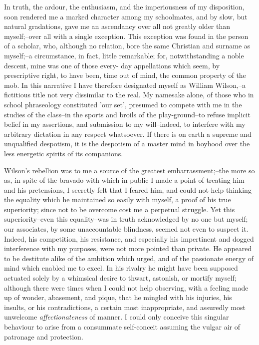 \documentclass[12pt]{article}
\begin{document}
     In truth, the ardour, the enthusiasm, and the imperiousness of
my disposition, soon rendered me a marked character among my
schoolmates, and by slow, but natural gradations, gave me an
ascendancy over all not greatly older than myself;--over all with
a single exception.  This exception was found in the person of a
scholar, who, although no relation, bore the same Christian and
surname as myself;--a circumstance, in fact, little remarkable;
for, notwithstanding a noble descent, mine was one of those every-
day appellations which seem, by prescriptive right, to have been,
time out of mind, the common property of the mob.  In this
narrative I have therefore designated myself as William Wilson,--a
fictitious title not very dissimilar to the real.  My namesake
alone, of those who in school phraseology constituted 'our set',
presumed to compete with me in the studies of the class--in the
sports and broils of the play-ground--to refuse implicit belief in
my assertions, and submission to my will--indeed, to interfere with
my arbitrary dictation in any respect whatsoever.  If there is on
earth a supreme and unqualified despotism, it is the despotism of
a master mind in boyhood over the less energetic spirits of its
companions.

     Wilson's rebellion was to me a source of the greatest
embarrassment;--the more so as, in spite of the bravado with which
in public I made a point of treating him and his pretensions, I
secretly felt that I feared him, and could not help thinking the
equality which he maintained so easily with myself, a proof
of his true superiority; since not to be overcome cost me a
perpetual struggle.  Yet this superiority--even this equality--was
in truth acknowledged by no one but myself; our associates, by some
unaccountable blindness, seemed not even to suspect it.  Indeed,
his competition, his resistance, and especially his impertinent and
dogged interference with my purposes, were not more pointed than
private.  He appeared to be destitute alike of the ambition which
urged, and of the passionate energy of mind which enabled me to
excel.  In his rivalry he might have been supposed actuated solely
by a whimsical desire to thwart, astonish, or mortify myself;
although there were times when I could not help observing, with a
feeling made up of wonder, abasement, and pique, that he mingled
with his injuries, his insults, or his contradictions, a certain
most inappropriate, and assuredly most unwelcome 
\emph{affectionateness} of manner.  I could only conceive this singular
behaviour to arise from a consummate self-conceit assuming the
vulgar air of patronage and protection.
\end{document}
